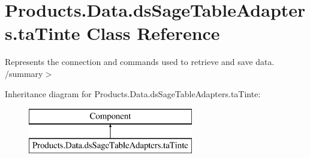 \hypertarget{class_products_1_1_data_1_1ds_sage_table_adapters_1_1ta_tinte}{}\section{Products.\+Data.\+ds\+Sage\+Table\+Adapters.\+ta\+Tinte Class Reference}
\label{class_products_1_1_data_1_1ds_sage_table_adapters_1_1ta_tinte}


Represents the connection and commands used to retrieve and save data. /summary$>$  


Inheritance diagram for Products.\+Data.\+ds\+Sage\+Table\+Adapters.\+ta\+Tinte\+:\begin{figure}[H]
\begin{center}
\leavevmode
\includegraphics[height=2.000000cm]{class_products_1_1_data_1_1ds_sage_table_adapters_1_1ta_tinte}
\end{center}
\end{figure}
